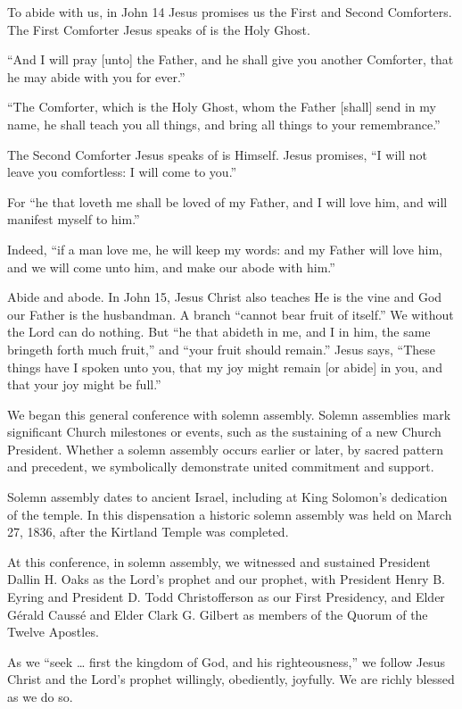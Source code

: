 \documentclass[letterpaper, 11pt]{report}
\begin{document}
To abide with us, in John 14 Jesus promises us the First and Second Comforters. The First Comforter Jesus speaks of is the Holy Ghost.

“And I will pray [unto] the Father, and he shall give you another Comforter, that he may abide with you for ever.”

“The Comforter, which is the Holy Ghost, whom the Father [shall] send in my name, he shall teach you all things, and bring all things to your remembrance.”

The Second Comforter Jesus speaks of is Himself. Jesus promises, “I will not leave you comfortless: I will come to you.”

For “he that loveth me shall be loved of my Father, and I will love him, and will manifest myself to him.”

Indeed, “if a man love me, he will keep my words: and my Father will love him, and we will come unto him, and make our abode with him.”

Abide and abode. In John 15, Jesus Christ also teaches He is the vine and God our Father is the husbandman. A branch “cannot bear fruit of itself.” We without the Lord can do nothing. But “he that abideth in me, and I in him, the same bringeth forth much fruit,” and “your fruit should remain.” Jesus says, “These things have I spoken unto you, that my joy might remain [or abide] in you, and that your joy might be full.”

We began this general conference with solemn assembly. Solemn assemblies mark significant Church milestones or events, such as the sustaining of a new Church President. Whether a solemn assembly occurs earlier or later, by sacred pattern and precedent, we symbolically demonstrate united commitment and support.

Solemn assembly dates to ancient Israel, including at King Solomon’s dedication of the temple. In this dispensation a historic solemn assembly was held on March 27, 1836, after the Kirtland Temple was completed.

At this conference, in solemn assembly, we witnessed and sustained President Dallin H. Oaks as the Lord’s prophet and our prophet, with President Henry B. Eyring and President D. Todd Christofferson as our First Presidency, and Elder Gérald Caussé and Elder Clark G. Gilbert as members of the Quorum of the Twelve Apostles.

As we “seek … first the kingdom of God, and his righteousness,” we follow Jesus Christ and the Lord’s prophet willingly, obediently, joyfully. We are richly blessed as we do so.
\end{document}

